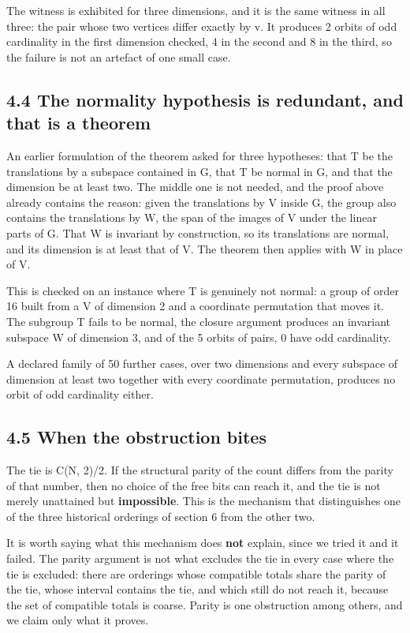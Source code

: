 \documentclass[11pt,a4paper]{article}
\begin{document}
The witness is exhibited for three dimensions, and it is the same witness in all three: the pair whose two vertices differ exactly by v. It produces 2 orbits of odd cardinality in the first dimension checked, 4 in the second and 8 in the third, so the failure is not an artefact of one small case.

\subsection*{4.4 The normality hypothesis is redundant, and that is a theorem}

An earlier formulation of the theorem asked for three hypotheses: that T be the translations by a subspace contained in G, that T be normal in G, and that the dimension be at least two. The middle one is not needed, and the proof above already contains the reason: given the translations by V inside G, the group also contains the translations by W, the span of the images of V under the linear parts of G. That W is invariant by construction, so its translations are normal, and its dimension is at least that of V. The theorem then applies with W in place of V.

This is checked on an instance where T is genuinely not normal: a group of order 16 built from a V of dimension 2 and a coordinate permutation that moves it. The subgroup T fails to be normal, the closure argument produces an invariant subspace W of dimension 3, and of the 5 orbits of pairs, 0 have odd cardinality.

A declared family of 50 further cases, over two dimensions and every subspace of dimension at least two together with every coordinate permutation, produces no orbit of odd cardinality either.

\subsection*{4.5 When the obstruction bites}

The tie is C(N, 2)/2. If the structural parity of the count differs from the parity of that number, then no choice of the free bits can reach it, and the tie is not merely unattained but \textbf{impossible}. This is the mechanism that distinguishes one of the three historical orderings of section 6 from the other two.

It is worth saying what this mechanism does \textbf{not} explain, since we tried it and it failed. The parity argument is not what excludes the tie in every case where the tie is excluded: there are orderings whose compatible totals share the parity of the tie, whose interval contains the tie, and which still do not reach it, because the set of compatible totals is coarse. Parity is one obstruction among others, and we claim only what it proves.
\end{document}
